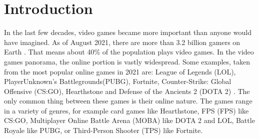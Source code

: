
\chapter{Introduction}
\label{cap:introduzione}

	In the last few decades, video games became more important than anyone would have imagined. 
	As of August 2021, there are more than 3.2 billion gamers on Earth \cite{site:statista}. 
	That means about 40\% of the population plays video games. 
	In the video games panorama, the online portion is vastly widespread. 
	Some examples, taken from the most popular online games in 2021 are:
	League of Legends (LOL), 
	PlayerUnknown's Battlegrounds(PUBG), 
	Fortnite,
	Counter-Strike: Global Offensive (CS:GO), 
	Hearthstone and 
	Defense of the Ancients 2 (DOTA 2) \cite{site:firstsportz}.
	The only common thing between these games is their online nature. 
	The games range in a variety of genres, for example
	card games like Hearthstone, 
	\gls{FPS} (FPS) like CS:GO, 
	Multiplayer Online Battle Arena (MOBA) like DOTA 2 and LOL, 
	Battle Royale like PUBG, or
	Third-Person Shooter (TPS) like Fortnite.
	
